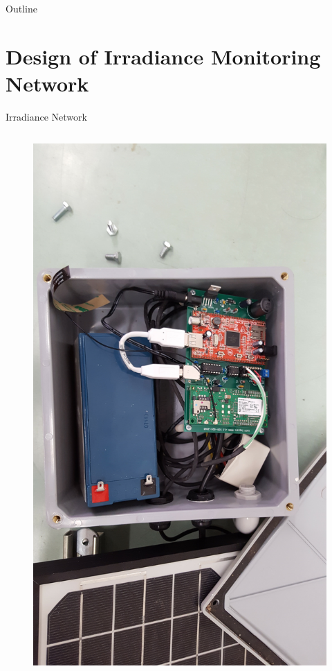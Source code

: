 \documentclass[aspectratio=169]{beamer}
\begin{document}
\begin{frame}{Outline}
  \tableofcontents
\end{frame}

\section{Design of Irradiance Monitoring Network}
\begin{frame}{Irradiance Network}
\begin{columns}
\begin{column}{0.3\textwidth}
\begin{figure}[h]
\centering
\includegraphics[width=\textwidth]{../dissertation/figs/sensor_interior.jpg}

\end{figure}
\end{column}
\end{columns}
\end{frame}
\end{document}

